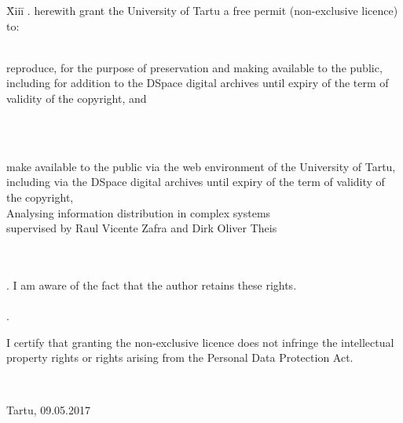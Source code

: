 \documentclass[12pt]{article}
\begin{document}
\begin{tabbing}
\= Xiii\=\kill
{}. \> herewith grant the University of Tartu a free permit (non-exclusive licence) to:\\\\ 

\> 
\begin{minipage}[t]{14.2cm}
reproduce, for the purpose of preservation and making available to the public, including for addition to the DSpace digital archives until expiry of the term of validity of the copyright, and
\end{minipage}
\\\\
\begin{minipage}[t]{14.2cm}
make available to the public via the web environment of the University of Tartu, including via the DSpace digital archives until expiry of the term of validity of the copyright,\\ 

Analysing information distribution in complex systems\\   

supervised by Raul Vicente Zafra and Dirk Oliver Theis

\end{minipage}\\\\ 
. \>I am aware of the fact that the author retains these rights.\\\\
. \>
\begin{minipage}[t]{14.2cm}
I certify that granting the non-exclusive licence does not infringe the intellectual property rights or rights arising from the Personal Data Protection Act. 
\end{minipage}\\
\end{tabbing}

\noindent
Tartu, 09.05.2017
\end{document}
